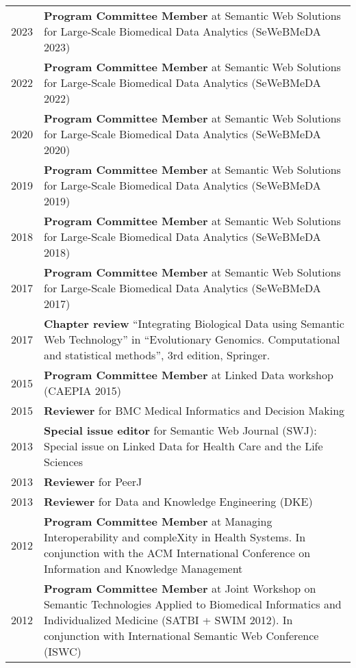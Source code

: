\documentclass[11pt,fullpage]{article}
\begin{document}

\begin{longtable}{p{0.5in}|p{5.5in}}
2023 & \textbf{Program Committee Member} at Semantic Web Solutions for Large-Scale Biomedical Data Analytics (SeWeBMeDA 2023) \\
2022 & \textbf{Program Committee Member} at Semantic Web Solutions for Large-Scale Biomedical Data Analytics (SeWeBMeDA 2022) \\
2020 & \textbf{Program Committee Member} at Semantic Web Solutions for Large-Scale Biomedical Data Analytics (SeWeBMeDA 2020) \\
2019 & \textbf{Program Committee Member} at Semantic Web Solutions for Large-Scale Biomedical Data Analytics (SeWeBMeDA 2019) \\  
2018 & \textbf{Program Committee Member} at Semantic Web Solutions for Large-Scale Biomedical Data Analytics (SeWeBMeDA 2018) \\
2017 & \textbf{Program Committee Member} at Semantic Web Solutions for Large-Scale Biomedical Data Analytics (SeWeBMeDA 2017) \\
2017 & \textbf{Chapter review} ``Integrating Biological Data using Semantic Web Technology'' in ``Evolutionary Genomics. Computational and statistical methods'', 3rd edition, Springer. \\
2015 & \textbf{Program Committee Member} at Linked Data workshop (CAEPIA 2015) \\
2015  & \textbf{Reviewer} for BMC Medical Informatics and Decision Making \\
2013 & {\bf Special issue editor} for Semantic Web Journal (SWJ): Special issue on Linked Data for Health Care and the Life Sciences \\
2013  & \textbf{Reviewer} for PeerJ \\
2013  & \textbf{Reviewer} for Data and Knowledge Engineering (DKE) \\
2012 & \textbf{Program Committee Member} at Managing Interoperability and compleXity in Health Systems. In conjunction with the ACM International Conference on Information and Knowledge Management\\
2012 & \textbf{Program Committee Member} at Joint Workshop on Semantic Technologies Applied to Biomedical Informatics and Individualized Medicine (SATBI + SWIM 2012). In conjunction with International Semantic Web Conference (ISWC)\\

\end{longtable}
\end{document}
